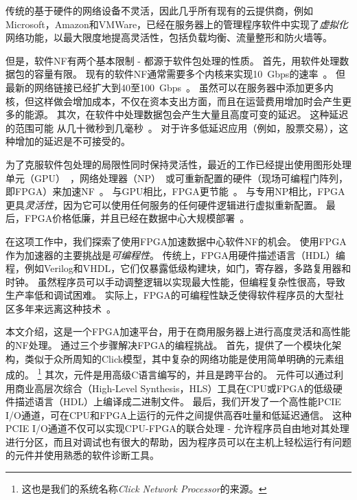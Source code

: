 传统的基于硬件的网络设备不灵活，因此几乎所有现有的云提供商，例如Microsoft，Amazon和VMWare，已经在服务器上的管理程序软件中实现了\textit{虚拟化}网络功能，以最大限度地提高灵活性，包括负载均衡、流量整形和防火墙等。

但是，软件NF有两个基本限制 - 都源于软件包处理的性质。
首先，用软件处理数据包的容量有限。
现有的软件NF通常需要多个内核来实现10~Gbps的速率~\cite{comb,martins2014clickos}。
但最新的网络链接已经扩大到40至100~Gbps~\cite{mellanox-100g}。
虽然可以在服务器中添加更多内核，但这样做会增加成本，不仅在资本支出方面，而且在运营费用增加时会产生更多的能源。
%
其次，在软件中处理数据包会产生大量且高度可变的延迟。 这种延迟的范围可能
从几十微秒到几毫秒~\cite{martins2014clickos,ananta,duet}。
对于许多低延迟应用（例如，股票交易），这种增加的延迟是不可接受的。

为了克服软件包处理的局限性同时保持灵活性，最近的工作已经提出使用图形处理单元（GPU）~\cite{packetshader}，网络处理器（NP）~\cite {cavium,netronome}或可重新配置的硬件（现场可编程门阵列，即FPGA）来加速NF~\cite{netfpga,smartnic,rubow2010chimpp}。
与GPU相比，FPGA更节能~\cite {fpga-vs-gpu,fpga-vs-gpu2}。
与专用NP相比，FPGA更具\emph{灵活性}，因为它可以使用任何服务的任何硬件逻辑进行虚拟重新配置。
最后，FPGA价格低廉，并且已经在数据中心大规模部署~\cite {smartnic,putnam2014reconfigurable}。

在这项工作中，我们探索了使用FPGA加速数据中心软件NF的机会。
使用FPGA作为加速器的主要挑战是\textit{可编程性}。
传统上，FPGA用硬件描述语言（HDL）编程，例如Verilog和VHDL，它们仅暴露低级构建块，如门，寄存器，多路复用器和时钟。
虽然程序员可以手动调整逻辑以实现最大性能，但编程复杂性很高，导致生产率低和调试困难。
实际上，FPGA的可编程性缺乏使得软件程序员的大型社区多年来远离这种技术~\cite{bacon2013fpga}。

本文介绍\name{}，这是一个FPGA加速平台，用于在商用服务器上进行高度灵活和高性能的NF处理。
\name{}通过三个步骤解决FPGA的编程挑战。
首先，提供了一个模块化架构，类似于众所周知的Click模型\cite {kohler2000click}，其中复杂的网络功能是使用简单明确的元素组成的。
\footnote{这也是我们的系统名称\textit{Click Network Processor}的来源。}
其次，\name 元件是用高级C语言编写的，并且是跨平台的。
\name 元件可以通过利用商业高层次综合（High-Level Synthesis，HLS）工具\cite {vivado,aoc,sdaccel}在CPU或FPGA的低级硬件描述语言（HDL）上编译成二进制文件。
最后，我们开发了一个高性能PCIE I/O通道，可在CPU和FPGA上运行的元件之间提供高吞吐量和低延迟通信。
这种PCIE I/O通道不仅可以实现CPU-FPGA的联合处理 - 允许程序员自由地对其处理进行分区，而且对调试也有很大的帮助，因为程序员可以在主机上轻松运行有问题的元件并使用熟悉的软件诊断工具。

